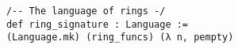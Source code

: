 \begin{dfn}
    \begin{lstlisting}
      /-- The language of rings -/
      def ring_signature : Language :=
      (Language.mk) (ring_funcs) (λ n, pempty)
    \end{lstlisting}



\end{dfn}








